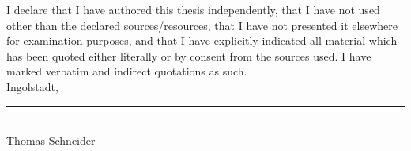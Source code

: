 
I declare that I have authored this thesis independently, that I have not used other than the declared sources/resources, that I have not presented it elsewhere for examination purposes, and that I have explicitly indicated all material which has been quoted either literally or by consent from the sources used. I have marked verbatim and indirect quotations as such.	\\[2em]
	
Ingolstadt, \rule{0.3\textwidth}{0.4pt}	\\ [1.5cm]
	
Thomas Schneider

